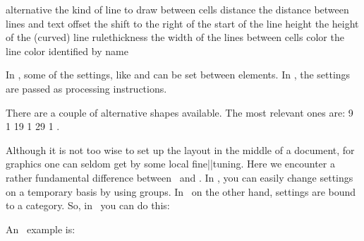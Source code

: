 \starttabulate[|Tl|l|]
\HL
\NC {} \NC \NC \NR
\HL
\NC alternative   \NC the kind of line to draw between cells \NC \NR
\NC distance      \NC the distance between lines and text \NC \NR
\NC offset        \NC the shift to the right of the start of the line \NC \NR
\NC height        \NC the height of the (curved) line \NC \NR
\NC rulethickness \NC the width of the lines between cells \NC \NR
\NC color         \NC the line color identified by name \NC \NR
\HL
\stoptabulate

In \TEX, some of the settings, like  and  can be set
between elements. In \XML, the settings are passed as processing instructions.

\startbuffer
\startSTEPchart
{}
   
   
\start
    \setupSTEPcells[color=darkred,style=bold]
     
      
\stop
{}
\stopSTEPchart
\stopbuffer

\typebuffer \getbuffer

There are a couple of alternative shapes available. The most relevant ones are:
\removeunwantedspaces {} {9} {1} { \TestShape {\recurselevel}}
\removeunwantedspaces {} {19} {1} { \TestShape {\recurselevel}}
\removeunwantedspaces {} {29} {1} { \TestShape {\recurselevel}}.

Although it is not too wise to set up the layout in the middle of a document, for
graphics one can seldom get by some local fine||tuning. Here we encounter a
rather fundamental difference between \TEX\ and \XML. In \TEX, you can easily
change settings on a temporary basis by using groups. In \XML\ on the other hand,
settings are bound to a category. So, in \TEX\ you can do this:

\startbuffer
\setupSTEPcells
  [important]
  [color=darkgreen,
   style=bold]

\startSTEPchart
{}
 
 
 
  
\stopSTEPchart
\stopbuffer

\typebuffer \getbuffer

\noindentation An \XML\ example is:

\startbuffer
\setupSTEPcells[demo-1][alternative=5]
\setupSTEPcells[demo-1][framecolor=darkred]
\setupSTEPtexts[demo-1][framecolor=darkgreen]
\setupSTEPlines[demo-1][alternative=4]
\setupSTEPtexts[demo-2][style=bold]
\stopbuffer

